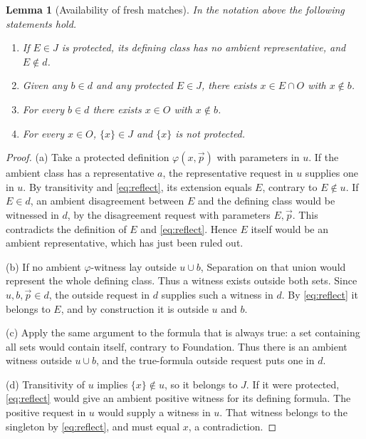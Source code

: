 \documentclass[11pt,a4paper]{article}
\numberwithin{equation}{section}
\newtheorem{lemma}[theorem]{Lemma}
\theoremstyle{definition}
\theoremstyle{remark}
\begin{document}
\begin{lemma}[Availability of fresh matches]\label{lem:fresh}
In the notation above the following statements hold.
\begin{enumerate}[label=(\alph*)]
\item If $E\in J$ is protected, its defining class has no ambient representative, and $E\notin d$.
\item Given any $b\in d$ and any protected $E\in J$, there exists $x\in E\cap O$ with $x\notin b$.
\item For every $b\in d$ there exists $x\in O$ with $x\notin b$.
\item For every $x\in O$, $\{x\}\in J$ and $\{x\}$ is not protected.
\end{enumerate}
\end{lemma}
\begin{proof}
(a) Take a protected definition $\varphi(x,\vec p)$ with parameters in $u$. If the ambient class has a representative $a$, the representative request in $u$ supplies one in $u$. By transitivity and \eqref{eq:reflect}, its extension equals $E$, contrary to $E\notin u$. If $E\in d$, an ambient disagreement between $E$ and the defining class would be witnessed in $d$, by the disagreement request with parameters $E,\vec p$. This contradicts the definition of $E$ and \eqref{eq:reflect}. Hence $E$ itself would be an ambient representative, which has just been ruled out.

(b) If no ambient $\varphi$-witness lay outside $u\cup b$, Separation on that union would represent the whole defining class. Thus a witness exists outside both sets. Since $u,b,\vec p\in d$, the outside request in $d$ supplies such a witness in $d$. By \eqref{eq:reflect} it belongs to $E$, and by construction it is outside $u$ and $b$.

(c) Apply the same argument to the formula that is always true: a set containing all sets would contain itself, contrary to Foundation. Thus there is an ambient witness outside $u\cup b$, and the true-formula outside request puts one in $d$.

(d) Transitivity of $u$ implies $\{x\}\notin u$, so it belongs to $J$. If it were protected, \eqref{eq:reflect} would give an ambient positive witness for its defining formula. The positive request in $u$ would supply a witness in $u$. That witness belongs to the singleton by \eqref{eq:reflect}, and must equal $x$, a contradiction.
\end{proof}
\end{document}
